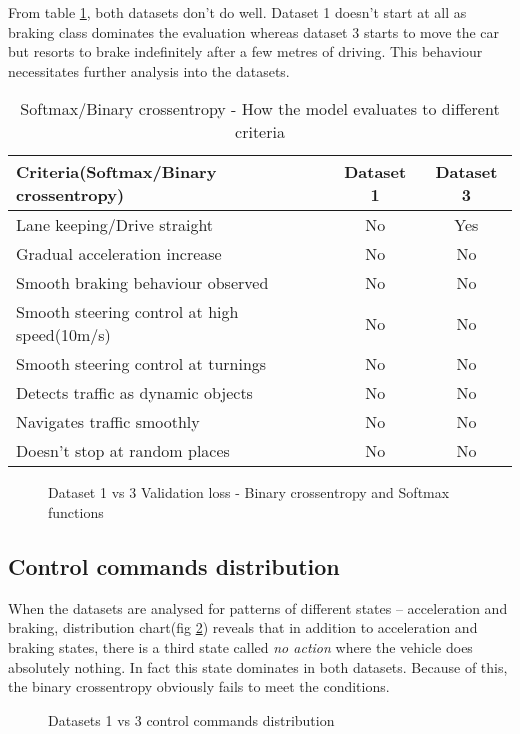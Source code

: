 From table \ref{table:softmaxandbce}, both datasets don't do well. Dataset 1 doesn't start
at all as braking class dominates the evaluation whereas dataset 3 starts to move the car
but resorts to brake indefinitely after a few metres of driving. This behaviour
necessitates further analysis into the datasets.
\begin{table}[h]
    \centering
\begin{tabular}{lcc}
    \toprule
    Criteria(Softmax/Binary crossentropy) & Dataset 1 & Dataset 3 \\\midrule
    Lane keeping/Drive straight  & No & Yes  \\
    Gradual acceleration increase & No & No\\
    Smooth braking behaviour observed & No & No \\
    Smooth steering control at high speed(10m/s) & No & No \\
    Smooth steering control at turnings & No & No\\
    Detects traffic as dynamic objects & No & No\\
    Navigates traffic smoothly & No & No\\
    Doesn't stop at random places & No & No \\\bottomrule
\end{tabular}
\caption{Softmax/Binary crossentropy - How the model evaluates to different criteria}
\label{table:softmaxandbce}
\end{table}
\begin{figure}[!ht]
	\centering
    \def\svgwidth{\textwidth}
    
    \caption{Dataset 1 vs 3 Validation loss - Binary crossentropy and Softmax functions}
    \label{fig:ds1andd3SoftactivatonBCE}
\end{figure}
\subsection*{Control commands distribution}
When the datasets are analysed for patterns of different states -- acceleration and
braking, distribution chart(fig \ref{fig:datasetscomparectrlcmds}) reveals that in addition to
acceleration and braking states, there is a third state called \textit{no action} where
the vehicle does absolutely nothing. In fact this state dominates in both datasets.
Because of this, the binary crossentropy obviously fails to meet the conditions.
\begin{figure}[!ht]
    \centering
    \def\svgwidth{\textwidth}
    
    \caption{Datasets 1 vs 3 control commands distribution}
    \label{fig:datasetscomparectrlcmds}
\end{figure}

